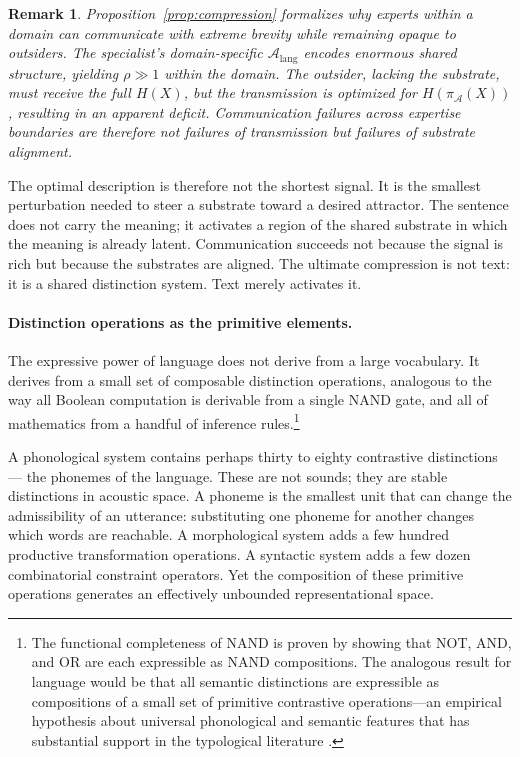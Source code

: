 \documentclass[12pt,a4paper]{article}
\newtheorem{remark}[theorem]{Remark}
\begin{document}
\begin{remark}
Proposition~\ref{prop:compression} formalizes why experts within a domain can communicate with extreme brevity while remaining opaque to outsiders. The specialist's domain-specific $\mathcal{A}_{\text{lang}}$ encodes enormous shared structure, yielding $\rho \gg 1$ within the domain. The outsider, lacking the substrate, must receive the full $H(X)$, but the transmission is optimized for $H(\pi_\mathcal{A}(X))$, resulting in an apparent deficit. Communication failures across expertise boundaries are therefore not failures of transmission but failures of substrate alignment.
\end{remark}

The optimal description is therefore not the shortest signal. It is the smallest perturbation needed to steer a substrate toward a desired attractor. The sentence does not carry the meaning; it activates a region of the shared substrate in which the meaning is already latent. Communication succeeds not because the signal is rich but because the substrates are aligned. The ultimate compression is not text: it is a shared distinction system. Text merely activates it.

\paragraph{Distinction operations as the primitive elements.}
The expressive power of language does not derive from a large vocabulary. It derives from a small set of composable distinction operations, analogous to the way all Boolean computation is derivable from a single NAND gate, and all of mathematics from a handful of inference rules.\footnote{The functional completeness of NAND is proven by showing that NOT, AND, and OR are each expressible as NAND compositions. The analogous result for language would be that all semantic distinctions are expressible as compositions of a small set of primitive contrastive operations---an empirical hypothesis about universal phonological and semantic features that has substantial support in the typological literature \cite{chomsky1965,jakobson1941}.}

A phonological system contains perhaps thirty to eighty contrastive distinctions — the phonemes of the language. These are not sounds; they are stable distinctions in acoustic space. A phoneme is the smallest unit that can change the admissibility of an utterance: substituting one phoneme for another changes which words are reachable. A morphological system adds a few hundred productive transformation operations. A syntactic system adds a few dozen combinatorial constraint operators. Yet the composition of these primitive operations generates an effectively unbounded representational space.
\end{document}
